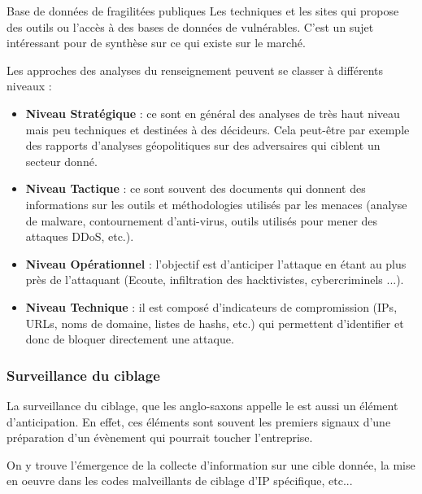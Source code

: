 \begin{techworkbox}{Base de données de fragilitées publiques}
Les techniques et les sites qui propose des outils ou l'accès à des bases de données de  vulnérables. C'est un sujet intéressant pour \fichetech de synthèse sur ce qui existe sur le marché. %
\end{techworkbox}




Les approches des analyses du renseignement peuvent se classer à différents niveaux :

\begin{itemize}
  \item \textbf{Niveau Stratégique} : ce sont en général des analyses de très haut niveau mais peu techniques et destinées à des décideurs. Cela peut-être par exemple des rapports d'analyses géopolitiques sur des adversaires qui ciblent un secteur donné.
  \item \textbf{Niveau Tactique} : ce sont souvent des documents qui donnent des informations sur les outils et méthodologies utilisés par les menaces (analyse de malware, contournement d’anti-virus, outils utilisés pour mener des attaques DDoS, etc.).
  \item \textbf{Niveau Opérationnel} : l’objectif est d’anticiper l'attaque en étant au plus près de l’attaquant (Ecoute, infiltration  des hacktivistes, cybercriminels ...).
  \item \textbf{Niveau Technique} : il est composé d’indicateurs de compromission (IPs, URLs, noms de domaine, listes de hashs, etc.) qui permettent d’identifier et donc de bloquer directement une attaque.
\end{itemize}


\subsubsection{Surveillance du ciblage}


La surveillance du ciblage, que les anglo-saxons appelle le  est aussi un élément d'anticipation. 
En effet, ces éléments sont souvent les premiers signaux d'une préparation d'un évènement  qui pourrait toucher l'entreprise.

On y trouve l'émergence de la collecte d'information sur une cible donnée, la mise en oeuvre dans les codes  malveillants de ciblage d'IP spécifique, etc...

